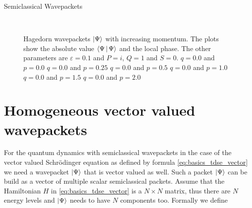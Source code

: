 \begin{chapter}{Semiclassical Wavepackets}
\begin{figure}
{  } \\
  \caption[Hagedorn wavepackets $\Ket{\Psi}$ with increasing momentum]{
    Hagedorn wavepackets $\Ket{\Psi}$ with increasing momentum. The plots show the
    absolute value $\Braket{\Psi|\Psi}$ and the local phase. The other parameters
    are $\varepsilon = 0.1$ and $P=i$, $Q=1$ and $S=0$.
      $q = 0.0$ and $p = 0.0$
     $q = 0.0$ and $p = 0.25$
      $q = 0.0$ and $p = 0.5$
      $q = 0.0$ and $p = 1.0$
      $q = 0.0$ and $p = 1.5$
	  $q = 0.0$ and $p = 2.0$
    \label{fig:hawp_impulse}
  }
\end{figure}


\section{Homogeneous vector valued wavepackets}

For the quantum dynamics with semiclassical wavepackets in the case of the vector
valued Schrödinger equation as defined by formula \eqref{eq:basics_tdse_vector} we
need a wavepacket $\Ket{\Psi}$ that is vector valued as well. Such a packet
$\Ket{\Psi}$ can be build as a vector of multiple scalar semiclassical packets.
Assume that the Hamiltonian $H$ in \eqref{eq:basics_tdse_vector} is a $N \times N$
matrix, thus there are $N$ energy levels and $\Ket{\Psi}$ needs to have $N$ components
too. Formally we define


\end{chapter}
